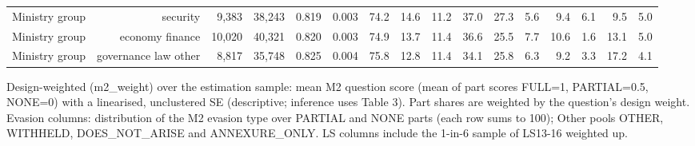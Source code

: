 \begin{table}[ht]
\begin{tabular}{lrrrrrrrrrrrrrrr}
Ministry group & security & 9,383 & 38,243 & 0.819 & 0.003 & 74.2 & 14.6 & 11.2 & 37.0 & 27.3 & 5.6 & 9.4 & 6.1 & 9.5 & 5.0 \\
Ministry group & economy finance & 10,020 & 40,321 & 0.820 & 0.003 & 74.9 & 13.7 & 11.4 & 36.6 & 25.5 & 7.7 & 10.6 & 1.6 & 13.1 & 5.0 \\
Ministry group & governance law other & 8,817 & 35,748 & 0.825 & 0.004 & 75.8 & 12.8 & 11.4 & 34.1 & 25.8 & 6.3 & 9.2 & 3.3 & 17.2 & 4.1 \\
\bottomrule
\end{tabular}
\par\footnotesize Design-weighted (m2\_weight) over the estimation sample: mean M2 question score (mean of part scores FULL=1, PARTIAL=0.5, NONE=0) with a linearised, unclustered SE (descriptive; inference uses Table 3). Part shares are weighted by the question's design weight. Evasion columns: distribution of the M2 evasion type over PARTIAL and NONE parts (each row sums to 100); Other pools OTHER, WITHHELD, DOES\_NOT\_ARISE and ANNEXURE\_ONLY. LS columns include the 1-in-6 sample of LS13-16 weighted up.
\end{table}
